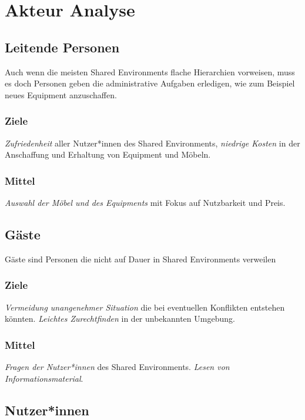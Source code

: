 \documentclass{article}
\begin{document}
\section{Akteur Analyse}


\subsection{Leitende Personen}

Auch wenn die meisten Shared Environments flache Hierarchien vorweisen, muss es doch Personen geben die administrative Aufgaben erledigen, wie zum Beispiel neues Equipment anzuschaffen.

\subsubsection*{Ziele}

\emph{Zufriedenheit} aller Nutzer*innen des Shared Environments, \emph{niedrige Kosten} in der Anschaffung und Erhaltung von Equipment und Möbeln.

\subsubsection*{Mittel}

\emph{Auswahl der Möbel und des Equipments} mit Fokus auf Nutzbarkeit und Preis. 

\subsection{Gäste}

Gäste sind Personen die nicht auf Dauer in Shared Environments verweilen

\subsubsection*{Ziele}
\emph{Vermeidung unangenehmer Situation} die bei eventuellen Konflikten entstehen könnten. \emph{Leichtes Zurechtfinden} in der unbekannten Umgebung. 

\subsubsection*{Mittel}
\emph{Fragen der Nutzer*innen} des Shared Environments. \emph{Lesen von Informationsmaterial}.  

\subsection{Nutzer*innen}
\end{document}
